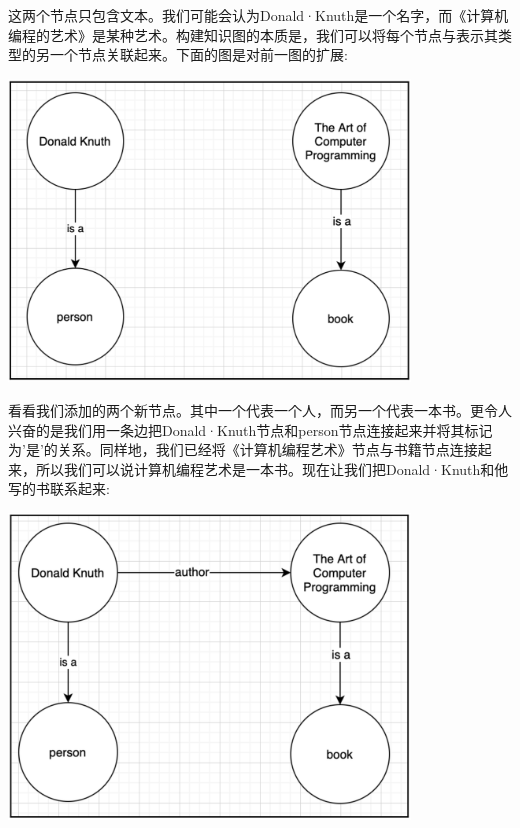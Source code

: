 这两个节点只包含文本。我们可能会认为Donald·Knuth是一个名字，而《计算机编程的艺术》是某种艺术。构建知识图的本质是，我们可以将每个节点与表示其类型的另一个节点关联起来。下面的图是对前一图的扩展: \par

\begin{center}
	\includegraphics[width=0.8\textwidth]{content/Section-3/Chapter-16/12}
\end{center}

看看我们添加的两个新节点。其中一个代表一个人，而另一个代表一本书。更令人兴奋的是我们用一条边把Donald·Knuth节点和person节点连接起来并将其标记为'是'的关系。同样地，我们已经将《计算机编程艺术》节点与书籍节点连接起来，所以我们可以说计算机编程艺术是一本书。现在让我们把Donald·Knuth和他写的书联系起来: \par

\begin{center}
	\includegraphics[width=0.8\textwidth]{content/Section-3/Chapter-16/13}
\end{center}

